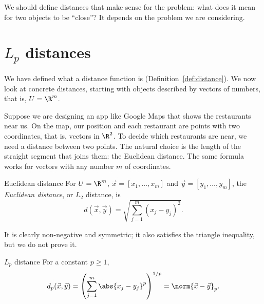 \documentclass[a4paper,12pt,oneside]{report}
\begin{document}
\begin{center}
\end{center}

We should define distances that make sense for the problem: what does
it mean for two objects to be ``close''? It depends on the problem we
are considering.

\section{\texorpdfstring{$L_p$}{Lp} distances}

We have defined what a distance function is
(Definition~\ref{def:distance}). We now look at concrete distances,
starting with objects described by vectors of numbers, that is,
$U=\R^m$.

Suppose we are designing an app like Google Maps that shows the
restaurants near us. On the map, our position and each restaurant are
points with two coordinates, that is, vectors in $\R^2$. To decide
which restaurants are near, we need a distance between two points. The
natural choice is the length of the straight segment that joins them:
the Euclidean distance. The same formula works for vectors with any
number $m$ of coordinates.

\begin{frameddefn}{Euclidean distance}\label{def:euclidean}
For $U=\R^m$, $\vec x=[x_1,\ldots,x_m]$ and $\vec y=[y_1,\ldots,y_m]$,
the \emph{Euclidean distance}, or $L_2$ distance, is
\[
  d(\vec x,\vec y)=\sqrt{\sum_{j=1}^{m}(x_j-y_j)^2}.
\]
\end{frameddefn}

It is clearly non-negative and symmetric; it also satisfies the
triangle inequality, but we do not prove it.

\begin{frameddefn}{$L_p$ distance}\label{def:lp-distance}
For a constant $p\geq1$,
\[
  d_p(\vec x,\vec y)
  =\left(\sum_{j=1}^{m}\abs{x_j-y_j}^p\right)^{1/p}
  =\norm{\vec x-\vec y}_p.
\]
\end{frameddefn}
\end{document}
